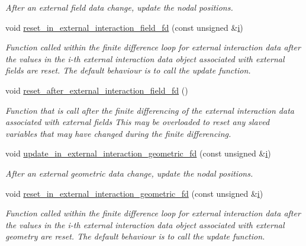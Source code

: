 \begin{DoxyCompactItemize}
\begin{DoxyCompactList}\small\item\em After an external field data change, update the nodal positions. \end{DoxyCompactList}\item 
void \hyperlink{classoomph_1_1FSIWallElement_adc6d07122f1624e2b66ce1a12b530e27}{reset\+\_\+in\+\_\+external\+\_\+interaction\+\_\+field\+\_\+fd} (const unsigned \&\hyperlink{cfortran_8h_adb50e893b86b3e55e751a42eab3cba82}{i})
\begin{DoxyCompactList}\small\item\em Function called within the finite difference loop for external interaction data after the values in the i-\/th external interaction data object associated with external fields are reset. The default behaviour is to call the update function. \end{DoxyCompactList}\item 
void \hyperlink{classoomph_1_1FSIWallElement_a5ba540936e15a03aef43bddd4d5b3f33}{reset\+\_\+after\+\_\+external\+\_\+interaction\+\_\+field\+\_\+fd} ()
\begin{DoxyCompactList}\small\item\em Function that is call after the finite differencing of the external interaction data associated with external fields This may be overloaded to reset any slaved variables that may have changed during the finite differencing. \end{DoxyCompactList}\item 
void \hyperlink{classoomph_1_1FSIWallElement_a495cc7de04e097186f497a7416655736}{update\+\_\+in\+\_\+external\+\_\+interaction\+\_\+geometric\+\_\+fd} (const unsigned \&\hyperlink{cfortran_8h_adb50e893b86b3e55e751a42eab3cba82}{i})
\begin{DoxyCompactList}\small\item\em After an external geometric data change, update the nodal positions. \end{DoxyCompactList}\item 
void \hyperlink{classoomph_1_1FSIWallElement_aa0b511d7c276578c95d26550576a9be0}{reset\+\_\+in\+\_\+external\+\_\+interaction\+\_\+geometric\+\_\+fd} (const unsigned \&\hyperlink{cfortran_8h_adb50e893b86b3e55e751a42eab3cba82}{i})
\begin{DoxyCompactList}\small\item\em Function called within the finite difference loop for external interaction data after the values in the i-\/th external interaction data object associated with external geometry are reset. The default behaviour is to call the update function. \end{DoxyCompactList}\item 

\end{DoxyCompactItemize}
